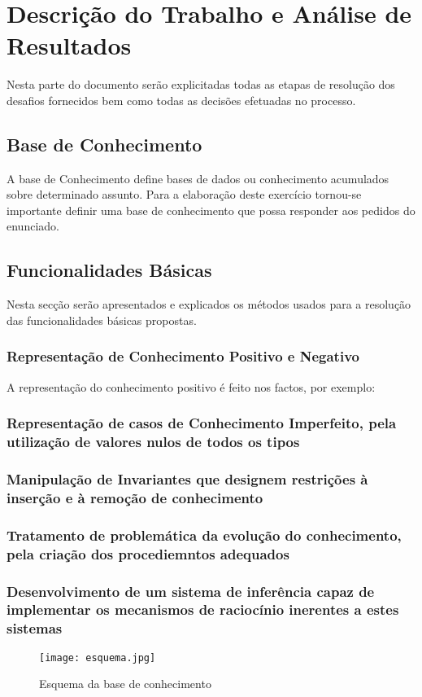 \chapter{Descrição do Trabalho e Análise de Resultados}
\label{cap:p3}

Nesta parte do documento serão explicitadas todas as etapas de resolução dos desafios fornecidos bem como todas as decisões efetuadas no processo.


\section{Base de Conhecimento}
\label{p3:baseConhe}

A base de Conhecimento define bases de dados ou conhecimento acumulados sobre determinado assunto.
Para a elaboração deste exercício tornou-se importante definir uma base de conhecimento
que possa responder aos pedidos do enunciado.

\section{Funcionalidades Básicas}
\label{p3:funcbasic}
Nesta secção serão apresentados e explicados os métodos usados para a resolução das funcionalidades básicas propostas.

\subsection{Representação de Conhecimento Positivo e Negativo}

A representação do conhecimento positivo é feito nos factos, por exemplo:


\subsection{Representação de casos de Conhecimento Imperfeito, pela utilização de valores nulos de todos os tipos}



\subsection{Manipulação de Invariantes que designem restrições à inserção e à remoção de conhecimento}


\subsection{Tratamento de problemática da evolução do conhecimento, pela criação dos procediemntos adequados}


\subsection{Desenvolvimento de um sistema de inferência capaz de implementar os mecanismos de raciocínio inerentes a estes sistemas}

\begin{figure}[<+htpb+>]
	\centering
	\texttt{[image: esquema.jpg]}
	\caption{Esquema da base de conhecimento }
	\label{p3:fig:esquema1}
\end{figure}



